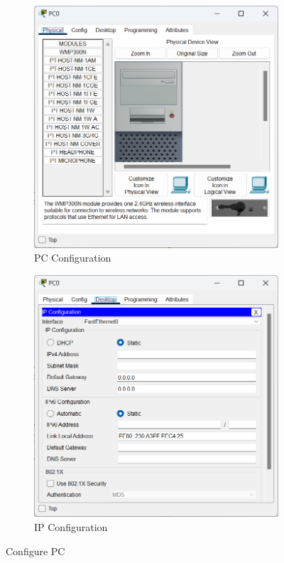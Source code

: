 \begin{figure}
    \begin{subfigure}[b]{0.48\textwidth}
        \centering
        \includegraphics[width=\textwidth]{images/hello-world-configure-1.png}
        \caption{PC Configuration}\label{fig:hello-world-configure-1}
    \end{subfigure}
    \begin{subfigure}[b]{0.48\textwidth}
        \centering
        \includegraphics[width=\textwidth]{images/hello-world-configure-2.png}
        \caption{IP Configuration}\label{fig:hello-world-configure-2}
    \end{subfigure}
    \caption{Configure PC}\label{fig:hello-world-configure}
\end{figure}

